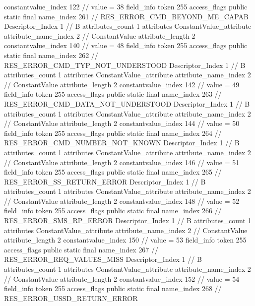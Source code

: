 {{{{{{{					constantvalue_index	122		// value = 38
				}
				}
			}
			field_info {
				token	255
				access_flags	public static final
				name_index	261		// RES_ERROR_CMD_BEYOND_ME_CAPAB
				Descriptor_Index	1		// B
				attributes_count	1
				attributes {
				ConstantValue_attribute {
					attribute_name_index	2		// ConstantValue
					attribute_length	2
					constantvalue_index	140		// value = 48
				}
				}
			}
			field_info {
				token	255
				access_flags	public static final
				name_index	262		// RES_ERROR_CMD_TYP_NOT_UNDERSTOOD
				Descriptor_Index	1		// B
				attributes_count	1
				attributes {
				ConstantValue_attribute {
					attribute_name_index	2		// ConstantValue
					attribute_length	2
					constantvalue_index	142		// value = 49
				}
				}
			}
			field_info {
				token	255
				access_flags	public static final
				name_index	263		// RES_ERROR_CMD_DATA_NOT_UNDERSTOOD
				Descriptor_Index	1		// B
				attributes_count	1
				attributes {
				ConstantValue_attribute {
					attribute_name_index	2		// ConstantValue
					attribute_length	2
					constantvalue_index	144		// value = 50
				}
				}
			}
			field_info {
				token	255
				access_flags	public static final
				name_index	264		// RES_ERROR_CMD_NUMBER_NOT_KNOWN
				Descriptor_Index	1		// B
				attributes_count	1
				attributes {
				ConstantValue_attribute {
					attribute_name_index	2		// ConstantValue
					attribute_length	2
					constantvalue_index	146		// value = 51
				}
				}
			}
			field_info {
				token	255
				access_flags	public static final
				name_index	265		// RES_ERROR_SS_RETURN_ERROR
				Descriptor_Index	1		// B
				attributes_count	1
				attributes {
				ConstantValue_attribute {
					attribute_name_index	2		// ConstantValue
					attribute_length	2
					constantvalue_index	148		// value = 52
				}
				}
			}
			field_info {
				token	255
				access_flags	public static final
				name_index	266		// RES_ERROR_SMS_RP_ERROR
				Descriptor_Index	1		// B
				attributes_count	1
				attributes {
				ConstantValue_attribute {
					attribute_name_index	2		// ConstantValue
					attribute_length	2
					constantvalue_index	150		// value = 53
				}
				}
			}
			field_info {
				token	255
				access_flags	public static final
				name_index	267		// RES_ERROR_REQ_VALUES_MISS
				Descriptor_Index	1		// B
				attributes_count	1
				attributes {
				ConstantValue_attribute {
					attribute_name_index	2		// ConstantValue
					attribute_length	2
					constantvalue_index	152		// value = 54
				}
				}
			}
			field_info {
				token	255
				access_flags	public static final
				name_index	268		// RES_ERROR_USSD_RETURN_ERROR
}}}}}
